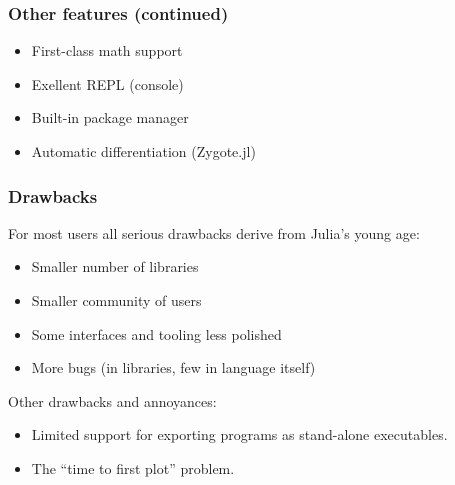 \documentclass[t]{beamer}
\begin{document}
\begin{frame}
  \frametitle{Other features (continued)}
  \begin{itemize}
  \item First-class math support
    \item Exellent REPL (console)
    \item Built-in package manager
    \item Automatic differentiation (Zygote.jl)
  \end{itemize}
\end{frame}

\begin{frame}
  \frametitle{Drawbacks}
  For most users all serious drawbacks derive from Julia's young age:
  \begin{itemize}
     \item Smaller number of libraries
     \item Smaller community of users
     \item Some interfaces and tooling less polished
     \item More bugs (in libraries, few in language itself)
  \end{itemize}
  Other drawbacks and annoyances:
  \begin{itemize}
     \item Limited support for exporting programs as stand-alone executables.
     \item The ``time to first plot'' problem. 
  \end{itemize}
\end{frame}
\end{document}
